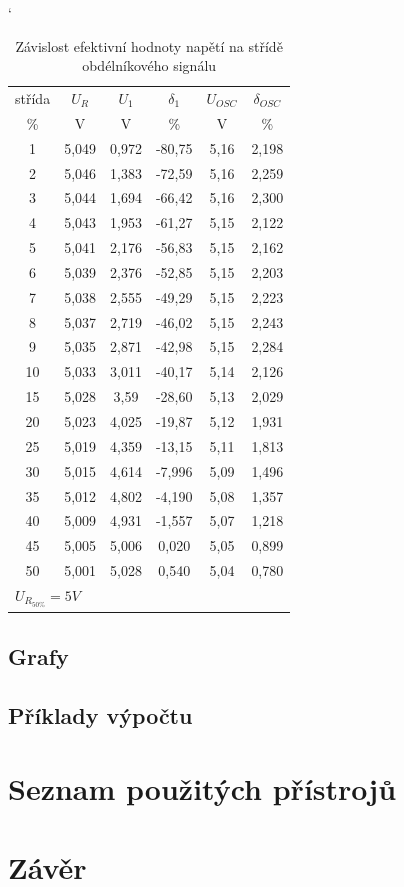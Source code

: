\documentclass[a4paper, czech]{article}
\begin{document}
\begin{table}[H]
    \catcode`
    \centering
    \caption{Závislost efektivní hodnoty napětí na střídě obdélníkového signálu}
    \begin{tabular}{cccccc}
        \toprule
        střída & $U_R$    & $U_1$    & $\delta_1$     & $U_{OSC}$ & $\delta_{OSC}$  \\
        \cmidrule(rl){1-1}
        \cmidrule(rl){2-2}
        \cmidrule(rl){3-4}
        \cmidrule(rl){5-6}
        \%     & V     & V     & \%     & V    & \%    \\
        \midrule
        1      & 5,049 & 0,972 & -80,75 & 5,16 & 2,198 \\
        2      & 5,046 & 1,383 & -72,59 & 5,16 & 2,259 \\
        3      & 5,044 & 1,694 & -66,42 & 5,16 & 2,300 \\
        4      & 5,043 & 1,953 & -61,27 & 5,15 & 2,122 \\
        5      & 5,041 & 2,176 & -56,83 & 5,15 & 2,162 \\
        6      & 5,039 & 2,376 & -52,85 & 5,15 & 2,203 \\
        7      & 5,038 & 2,555 & -49,29 & 5,15 & 2,223 \\
        8      & 5,037 & 2,719 & -46,02 & 5,15 & 2,243 \\
        9      & 5,035 & 2,871 & -42,98 & 5,15 & 2,284 \\
        10     & 5,033 & 3,011 & -40,17 & 5,14 & 2,126 \\
        15     & 5,028 & 3,59  & -28,60 & 5,13 & 2,029 \\
        20     & 5,023 & 4,025 & -19,87 & 5,12 & 1,931 \\
        25     & 5,019 & 4,359 & -13,15 & 5,11 & 1,813 \\
        30     & 5,015 & 4,614 & -7,996 & 5,09 & 1,496 \\
        35     & 5,012 & 4,802 & -4,190 & 5,08 & 1,357 \\
        40     & 5,009 & 4,931 & -1,557 & 5,07 & 1,218 \\
        45     & 5,005 & 5,006 & 0,020  & 5,05 & 0,899 \\
        50     & 5,001 & 5,028 & 0,540  & 5,04 & 0,780 \\
        \bottomrule
        \multicolumn{2}{l}{$U_{R_{50\%}} = 5V$}
    \end{tabular}
\end{table}

\subsection{Grafy}

\subsection{Příklady výpočtu}

\section{Seznam použitých přístrojů}

\section{Závěr}
\end{document}
